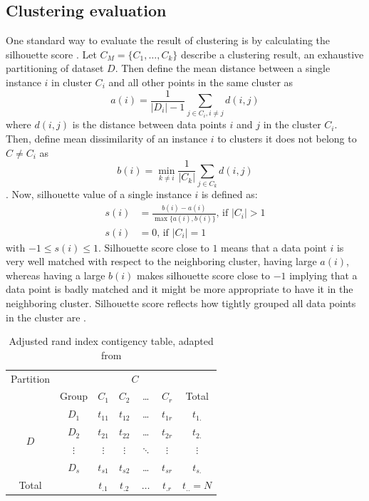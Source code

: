 \subsection{Clustering evaluation}

One standard way to evaluate the result of clustering is by
calculating the silhouette score \citep{reynolds2006clustering}. 
Let $C_M = \{C_1, \dots, C_k\}$ describe a clustering result, an 
exhaustive partitioning of dataset $D$. Then define the mean distance
between a single instance $i$ in cluster $C_i$ and all other points in the same cluster as
$$
a(i) = \frac{1}{|D_i| - 1} \sum_{j \in C_i, i \neq j} d(i, j)
$$
where $d(i, j)$ is the distance between data points $i$ and $j$ in
the cluster $C_i$. Then, define mean dissimilarity of an instance $i$ to
clusters it does not belong to $C \neq C_i$ as
$$
b(i) = \min_{k \neq i} \frac{1}{|C_k|} \sum_{j \in C_k} d(i, j)
$$.
Now, silhouette value of a single instance $i$ is defined as:
\begin{align}\label{eq:silhouette}
	s(i) &= \frac{b(i) - a(i)}{\max\{a(i), b(i)\}} \textrm{, if } |C_i| > 1 \\
	s(i) &= 0 \textrm{, if } |C_i| = 1
\end{align}
with $-1 \leq s(i) \leq 1$. Silhouette score close to $1$ means that a data point $i$
is very well matched with respect to the neighboring cluster, having large $a(i)$, whereas
having a large $b(i)$ makes silhouette score close to $-1$ implying that a data point is badly matched 
and it might be more appropriate to have it in the neighboring cluster. 
Silhouette score reflects how tightly grouped all data points in the cluster are
\citep{kaufman2009finding}.

\begin{table}
	\centering
	\begin{tabular}{c c c c c c c}
		\toprule
		Partition & & \multicolumn{4}{c}{$C$} & \\ \cline{3-6}
		& Group & $C_1$ & $C_2$ & \dots & $C_r$ & Total \\
		\midrule
		\multirow{4}{*}{$D$} & $D_1$ & $t_{11}$ & $t_{12}$ & \dots & $t_{1r}$ & $t_{1.}$ \\
		                     & $D_2$ & $t_{21}$ & $t_{22}$ & \dots & $t_{2r}$ & $t_{2.}$ \\
				     & $\vdots$ & $\vdots$ & $\vdots$ & $\ddots$ & $\vdots$ & $\vdots$ \\
		                     & $D_s$ & $t_{s1}$ & $t_{s2}$ & \dots & $t_{sr}$ & $t_{s.}$ \\
				     \midrule
		Total & &                      $t_{.1}$ & $t_{.2}$ & $\dots$&$t_{.r}$ & $t_{..} = N$ \\
				     \bottomrule
	\end{tabular}
	\caption{Adjusted rand index contigency table, adapted from \citep{santos2009use}}
	\label{tab:adjusted_rand}
\end{table}


